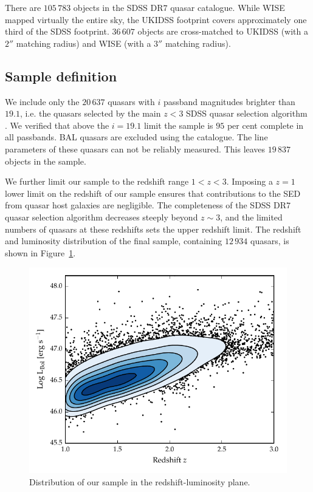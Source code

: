 There are $105\,783$ objects in the SDSS DR$7$ quasar catalogue. 
While WISE mapped virtually the entire sky, the UKIDSS footprint covers approximately one third of the SDSS footprint. 
$36\,607$ objects are cross-matched to UKIDSS (with a $2''$ matching radius) and WISE (with a $3$$''$ matching radius).

\subsection{Sample definition}

We include only the $20\,637$ quasars with $i$ passband magnitudes brighter than $19.1$, i.e. the quasars selected by the main $z<3$ SDSS quasar selection algorithm \citep{richards02}. 
We verified that above the $i=19.1$ limit the sample is $95$ per cent complete in all passbands.
BAL quasars are excluded using the \citet{allen11} catalogue.
The  line parameters of these quasars can not be reliably measured.
This leaves $19\,837$  objects in the sample. 

We further limit our sample to the redshift range $1 < z < 3$. 
Imposing a $z=1$ lower limit on the redshift of our sample ensures that contributions to the SED from quasar host galaxies are negligible.
The completeness of the SDSS DR$7$ quasar selection algorithm decreases steeply beyond $z\sim3$, and the limited numbers of quasars at these redshifts sets the upper redshift limit. 
The redshift and luminosity distribution of the final sample, containing $12\,934$ quasars, is shown in Figure~\ref{fig:lum_z}. 

\begin{figure}
  \centering
  \includegraphics[width=\textwidth]{figures/chapter05/lum_z.pdf}
  \caption[{Distribution of our sample in the redshift-luminosity plane.}]{Distribution of our sample in the redshift-luminosity plane.}
  \label{fig:lum_z}
\end{figure}

